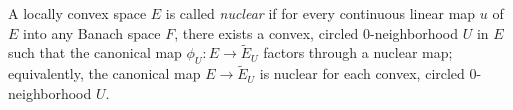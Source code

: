 A locally convex space $E$ is called \textit{nuclear} if for every continuous linear map $u$ of $E$ into any Banach space $F$, there exists a convex, circled $0$-neighborhood $U$ in $E$ such that the canonical map $\phi_U: E \to \tilde{E}_U$ factors through a nuclear map; equivalently, the canonical map $E \to \tilde{E}_U$ is nuclear for each convex, circled $0$-neighborhood $U$.
